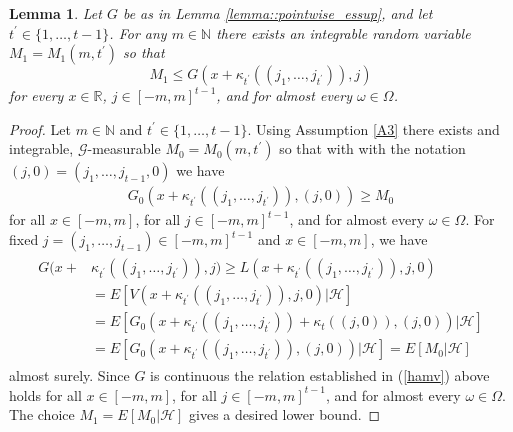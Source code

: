 \documentclass[a4paper]{article}
\newtheorem{lemma}[theorem]{Lemma}
\begin{document}
\begin{lemma}\label{lemma::lower_bd}
Let $G$ be as in Lemma \ref{lemma::pointwise_essup}, and let $t^{'} \in \{1,\hdots,t-1\}$. For any $m\in \mathbb{N}$ there exists an integrable random variable $ M_1 = M_1(m,t^{'})$ so that $$M_1 \leq G(x + \kappa_{t^{'}}((j_1,\hdots, j_{t^{'}})),j)$$ for every $x \in \mathbb{R}$, $j \in [-m,m]^{t-1}$, and  for almost every $\omega \in \Omega$.
\end{lemma}

\begin{proof}
Let $m \in \mathbb{N}$ and $t^{'} \in \{1,\hdots,t-1\} $. Using Assumption \ref{A3} there exists and integrable, $\mathcal{G}$-measurable $M_0 = M_0(m,t^{'})$ so that with with the notation $(j,0) = (j_1,\hdots, j_{t-1}, 0)$ we have 
\begin{align*}
G_0(x + \kappa_{t^{'}}((j_1,\hdots,j_{t^{'}})), (j, 0)) \geq M_0
\end{align*}
for all $x \in [-m,m]$, for all $j \in [-m,m]^{t-1}$, and for almost every $\omega\in\Omega$. For fixed $j = (j_1, \hdots, j_{t-1}) \in [-m,m]^{t-1}$ and $x \in [-m,m]$, we have  
\begin{align}\label{hamv}
\begin{split}
G(x + &\kappa_{t^{'}}((j_1,\hdots,j_{t^{'}})),j) \geq L(x + \kappa_{t^{'}}((j_1,\hdots,j_{t^{'}})),j,0)
\\
&
= E[V(x + \kappa_{t^{'}}((j_1,\hdots,j_{t^{'}})), j, 0)| \mathcal{H}] 
\\
&
= E[G_0(x + \kappa_{t^{'}}((j_1,\hdots,j_{t^{'}})) + \kappa_{t}((j, 0)), (j, 0))| \mathcal{H}]
\\
&
= E[G_0(x + \kappa_{t^{'}}((j_1,\hdots,j_{t^{'}})), (j, 0))| \mathcal{H}] = E[M_0| \mathcal{H}]
\end{split}
\end{align}
almost surely. Since $G$ is continuous the relation established in (\ref{hamv}) above holds for all $x \in [-m,m]$, for all $j \in [-m,m]^{t-1}$, and for almost every $\omega\in\Omega$. The choice $M_1 = E[M_0| \mathcal{H}]$ gives a desired lower bound. 

\end{proof}
\end{document}
